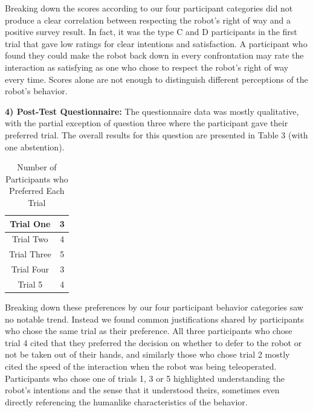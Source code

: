 \documentclass[letterpaper, 10 pt, conference]{ieeeconf}  %
\begin{document}
Breaking down the scores according to our four participant categories did not produce a clear correlation between respecting the robot's right of way and a positive survey result. In fact, it was the type C and D participants in the first trial that gave low ratings for clear intentions and satisfaction. A participant who found they could make the robot back down in every confrontation may rate the interaction as satisfying as one who chose to respect the robot's right of way every time. Scores alone are not enough to distinguish different perceptions of the robot's behavior.

\textbf{4) Post-Test Questionnaire:} The questionnaire data was mostly qualitative, with the partial exception of question three where the participant gave their preferred trial. The overall results for this question are presented in Table 3 (with one abstention).

\begin{table}[h]
\caption{Number of Participants who Preferred Each Trial }
\label{Preferences}
\begin{center}
\begin{tabular}{|c||c|}
\hline
Trial One & 3\\
\hline
Trial Two & 4\\
\hline
Trial Three & 5\\
\hline
Trial Four & 3\\
\hline
Trial 5 & 4\\
\hline
\end{tabular}
\end{center}
\end{table}

Breaking down these preferences by our four participant behavior categories saw no notable trend. Instead we found common justifications shared by participants who chose the same trial as their preference. All three participants who chose trial 4 cited that they preferred the decision on whether to defer to the robot or not be taken out of their hands, and similarly those who chose trial 2 mostly cited the speed of the interaction when the robot was being teleoperated. Participants who chose one of trials 1, 3 or 5 highlighted understanding the robot's intentions and the sense that it understood theirs, sometimes even directly referencing the humanlike characteristics of the behavior.

\end{document}
